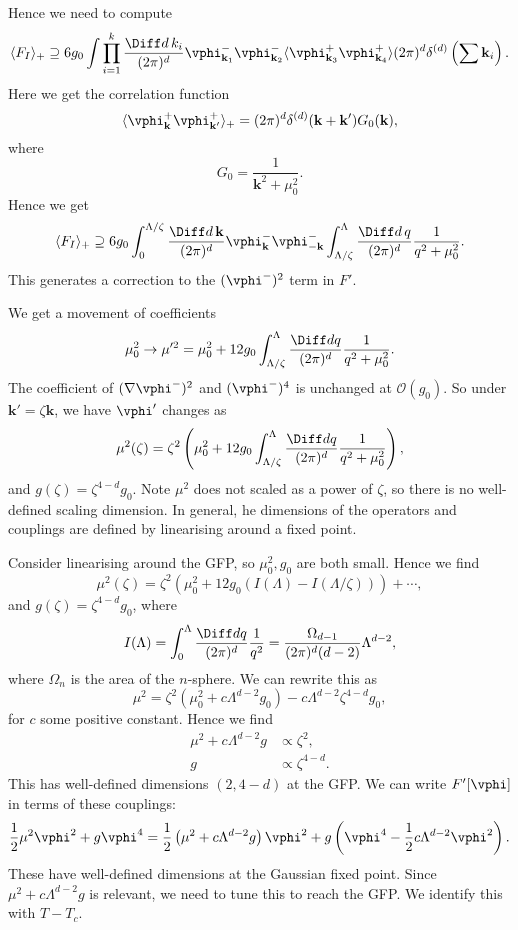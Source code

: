 \documentclass[12pt]{article}
\begin{document}
Hence we need to compute
\[
\langle F_I\rangle_+ \supseteq 6g_0 \int \prod_{i = 1}^k \frac{\Diff d \, k_i}{(2 \pi)^{d}} \vphi_{\mathbf{k}_1}^{-} \vphi_{\mathbf{k}_2}^{-} \langle \vphi_{\mathbf{k}_3}^{+} \vphi_{\mathbf{k}_4}^{+} \rangle (2 \pi)^d \delta^{(d)} \left( \sum \mathbf{k}_i \right).
\]
Here we get the correlation function
\[
\langle \vphi_{\mathbf{k}}^+ \vphi_{\mathbf{k}'}^+ \rangle_+ = (2\pi)^d \delta^{(d)}(\mathbf{k} + \mathbf{k}') G_0(\mathbf{k}),
\]
where
\[
G_0 = \frac{1}{\mathbf{k}^2 + \mu_0^2}.
\]
Hence we get
\[
\langle F_I \rangle_+ \supseteq 6 g_0 \int_{0}^{\Lambda/\zeta} \frac{\Diff d \, \mathbf{k}}{(2 \pi)^{d}} \vphi_{\mathbf{k}}^{-} \vphi_{-\mathbf{k}}^{-} \int_{\Lambda/\zeta}^{\Lambda} \frac{\Diff d \, q}{(2 \pi)^{d}} \frac{1}{q^2 + \mu_0^2}.
\]
This generates a correction to the $(\vphi^{-})^2$ term in $F'$.


We get a movement of coefficients
\[
\mu_0^2 \to \mu'^2 = \mu_0^2 + 12 g_0 \int_{\Lambda/\zeta}^\Lambda \frac{\Diff d q}{(2 \pi)^{d}} \frac{1}{q^2 + \mu_0^2}.
\]
The coefficient of $(\nabla \vphi^{-})^2$ and $(\vphi^{-})^{4}$ is unchanged at $\mathcal{O}(g_0)$. So under $\mathbf{k}' = \zeta \mathbf{k}$, we have $\vphi'$ changes as
\[
\mu^2(\zeta) = \zeta^2\left( \mu_0^2 + 12 g_0 \int_{\Lambda/\zeta}^{\Lambda} \frac{\Diff d q}{(2 \pi)^{d}} \frac{1}{q^2 + \mu_0^2} \right),
\]
and $g(\zeta) = \zeta^{4 - d} g_0$. Note $\mu^2$ does not scaled as a power of $\zeta$, so there is no well-defined scaling dimension. In general, he dimensions of the operators and couplings are defined by linearising around a fixed point.

Consider linearising around the GFP, so $\mu_0^2, g_0$ are both small. Hence we find
\[
\mu^2(\zeta) = \zeta^2(\mu_0^2 + 12 g_0(I(\Lambda) - I(\Lambda/\zeta))) + \cdots,
\]
and $g(\zeta) = \zeta^{4 - d}g_0$, where
\[
	I(\Lambda) = \int_0^{\Lambda} \frac{\Diff d q}{(2 \pi)^{d}} \frac{1}{q^2} = \frac{\Omega_{d-1}}{(2 \pi)^{d} (d - 2)} \Lambda^{d-2},
\]
where $\Omega_n$ is the area of the $n$-sphere. We can rewrite this as
\[
\mu^2 = \zeta^2(\mu_0^2 + c \Lambda^{d-2} g_0) - c \Lambda^{d-2} \zeta^{4-d} g_0,
\]
for $c$ some positive constant. Hence we find
\begin{align*}
	\mu^2 + c \Lambda^{d-2} g &\propto \zeta^2, \\
	g &\propto \zeta^{4 - d}.
\end{align*}
This has well-defined dimensions $(2, 4 -d)$ at the GFP. We can write $F'[\vphi]$ in terms of these couplings:
\[
\frac{1}{2} \mu^2 \vphi^2 + g \vphi^{4} = \frac{1}{2} \left(\mu^2 + c \Lambda^{d-2} g\right) \vphi^2 + g \left(\vphi^{4} - \frac{1}{2} c \Lambda^{d-2} \vphi^2\right).
\]
These have well-defined dimensions at the Gaussian fixed point. Since $\mu^2 + c \Lambda^{d-2} g$ is relevant, we need to tune this to reach the GFP. We identify this with $T - T_c$.
\end{document}
